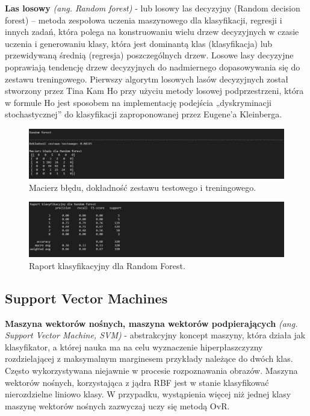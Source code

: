 \documentclass{article}
\begin{document}
\textbf{Las losowy} \emph{(ang. Random forest)} - lub losowy las decyzyjny (Random decision forest) – metoda zespołowa uczenia maszynowego dla klasyfikacji, regresji i innych zadań, która polega na konstruowaniu wielu drzew decyzyjnych w czasie uczenia i generowaniu klasy, która jest dominantą klas (klasyfikacja) lub przewidywaną średnią (regresja) poszczególnych drzew. Losowe lasy decyzyjne poprawiają tendencję drzew decyzyjnych do nadmiernego dopasowywania się do zestawu treningowego. Pierwszy algorytm losowych lasów decyzyjnych został stworzony przez Tina Kam Ho przy użyciu metody losowej podprzestrzeni, która w formule Ho jest sposobem na implementację podejścia „dyskryminacji stochastycznej” do klasyfikacji zaproponowanej przez Eugene'a Kleinberga.

\begin{figure}[!htb]
\centering
\includegraphics[width=\textwidth]{image/RF.png}
\caption{Macierz błędu, dokładność zestawu testowego i treningowego.}
\end{figure}
\newpage
\begin{figure}[!htb]
\centering
\includegraphics[width=\textwidth]{image/repo_RF.png}
\caption{Raport klasyfikacyjny dla Random Forest.}
\end{figure}

\subsection{Support Vector Machines}

\textbf{Maszyna wektorów nośnych, maszyna wektorów podpierających} \emph{(ang. Support Vector Machine, SVM)} - abstrakcyjny koncept maszyny, która działa jak klasyfikator, a której nauka ma na celu wyznaczenie hiperpłaszczyzny rozdzielającej z maksymalnym marginesem przykłady należące do dwóch klas. Często wykorzystywana niejawnie w procesie rozpoznawania obrazów. Maszyna wektorów nośnych, korzystająca z jądra RBF jest w stanie klasyfikować nierozdzielne liniowo klasy. W przypadku, wystąpienia więcej niż jednej klasy maszynę wektorów nośnych zazwyczaj uczy się metodą OvR.
\end{document}

